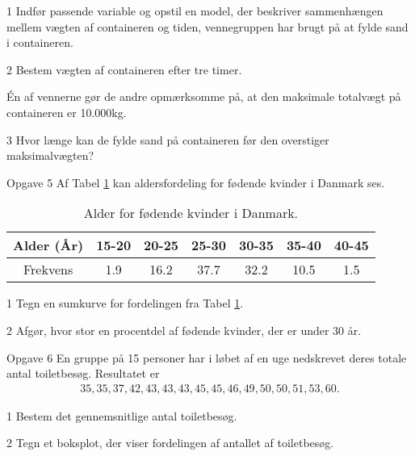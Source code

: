 \begin{delopgave}{}{1}
	Indfør passende variable og opstil en model, der beskriver sammenhængen mellem vægten af containeren og tiden, vennegruppen har brugt på at fylde sand i containeren. 
\end{delopgave}
\begin{delopgave}{}{2}
	Bestem vægten af containeren efter tre timer. 
\end{delopgave}
\begin{meretekst}
	Én af vennerne gør de andre opmærksomme på, at den maksimale totalvægt på containeren er 10.000kg.
\end{meretekst}
\begin{delopgave}{}{3}
	Hvor længe kan de fylde sand på containeren før den overstiger maksimalvægten?
\end{delopgave}
\begin{opgavetekst}{Opgave 5}
	Af Tabel \ref{tab:labour} kan aldersfordeling for fødende kvinder i Danmark ses.
	\begin{table}[H]
	\centering	
	\begin{tabular}{c|c|c|c|c|c|c}
		Alder (År) & 15-20 & 20-25 & 25-30 & 30-35 & 35-40 & 40-45\\
		\hline
		Frekvens & 1.9 & 16.2 & 37.7 & 32.2 & 10.5 & 1.5
	\end{tabular}
	\caption{Alder for fødende kvinder i Danmark.}
	\label{tab:labour}
	\end{table}
	\phantom{h}
\end{opgavetekst}
\begin{delopgave}{}{1}
	Tegn en sumkurve for fordelingen fra Tabel \ref{tab:labour}.
\end{delopgave}
\begin{delopgave}{}{2}
	Afgør, hvor stor en procentdel af fødende kvinder, der er under 30 år.
\end{delopgave}

\begin{opgavetekst}{Opgave 6}
	En gruppe på 15 personer har i løbet af en uge nedskrevet deres totale antal toiletbesøg. Resultatet er 
	\begin{align*}
		35,35,37,42,43,43,43,45,45,46,49,50,50,51,53,60.
	\end{align*}
\end{opgavetekst}
\begin{delopgave}{}{1}
	Bestem det gennemsnitlige antal toiletbesøg.
\end{delopgave}
\begin{delopgave}{}{2}
	Tegn et boksplot, der viser fordelingen af antallet af toiletbesøg. 
\end{delopgave}


